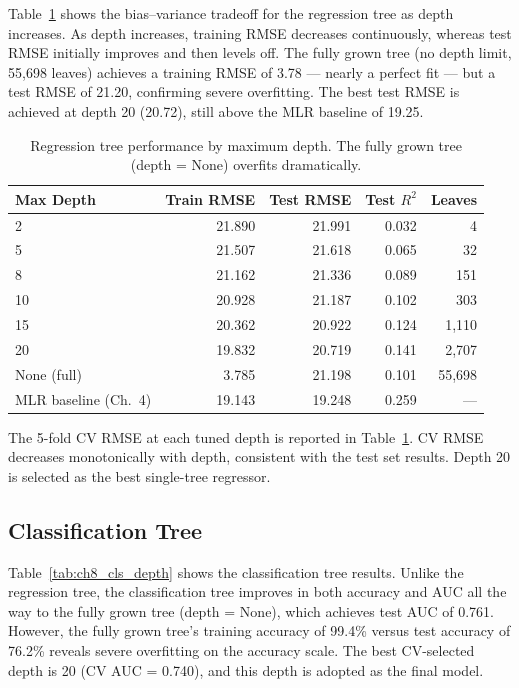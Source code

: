 \documentclass[12pt, oneside]{book}
\begin{document}
Table~\ref{tab:ch8_reg_depth} shows the bias--variance tradeoff for the regression tree as depth increases. As depth increases, training RMSE decreases continuously, whereas test RMSE initially improves and then levels off. The fully grown tree (no depth limit, 55{,}698 leaves) achieves a training RMSE of 3.78 — nearly a perfect fit — but a test RMSE of 21.20, confirming severe overfitting. The best test RMSE is achieved at depth 20 (20.72), still above the MLR baseline of 19.25.
 
\begin{table}[H]
\centering
\caption{Regression tree performance by maximum depth. The fully grown tree (depth = None) overfits dramatically.}
\label{tab:ch8_reg_depth}
\begin{tabular}{lrrrr}
\toprule
\textbf{Max Depth} & \textbf{Train RMSE} & \textbf{Test RMSE} & \textbf{Test $R^2$} & \textbf{Leaves} \\
\midrule
2          & 21.890 & 21.991 & 0.032 & 4       \\
5          & 21.507 & 21.618 & 0.065 & 32      \\
8          & 21.162 & 21.336 & 0.089 & 151     \\
10         & 20.928 & 21.187 & 0.102 & 303     \\
15         & 20.362 & 20.922 & 0.124 & 1{,}110 \\
20         & 19.832 & 20.719 & 0.141 & 2{,}707 \\
None (full)& 3.785  & 21.198 & 0.101 & 55{,}698 \\
\midrule
MLR baseline (Ch.\ 4) & 19.143 & 19.248 & 0.259 & --- \\
\bottomrule
\end{tabular}
\end{table}
 
The 5-fold CV RMSE at each tuned depth is reported in Table~\ref{tab:ch8_reg_depth}. CV RMSE decreases monotonically with depth, consistent with the test set results. Depth 20 is selected as the best single-tree regressor.
 
 
\subsection{Classification Tree}
 
Table~\ref{tab:ch8_cls_depth} shows the classification tree results. Unlike the regression tree, the classification tree improves in both accuracy and AUC all the way to the fully grown tree (depth = None), which achieves test AUC of 0.761. However, the fully grown tree's training accuracy of 99.4\% versus test accuracy of 76.2\% reveals severe overfitting on the accuracy scale. The best CV-selected depth is 20 (CV AUC = 0.740), and this depth is adopted as the final model.
 
\end{document}
